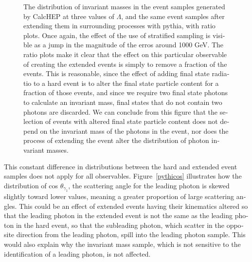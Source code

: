 \begin{english}
\begin{figure}[hbt]
\centering
\begin{minipage}[b]{.69\textwidth}\hspace{-1.5em}\makebox[0pt][l]{
\noindent\begin{infilsf}
\tiny

\end{infilsf}}
\end{minipage}\hfill
\caption{The distribution of invariant masses in the event samples generated by CalcHEP at three values of $\Lambda$, and the same event samples after extending them in surrounding processes with pythia, with ratio plots. Once again, the effect of the use of stratified sampling is visible as a jump in the magnitude of the erros around 1000 GeV. The ratio plots make it clear that the effect on this particular observable of creating the extended events is simply to remove a fraction of the events. This is reasonable, since the effect of adding final state radiatio to a hard event is to alter the final state particle content for a fraction of those events, and since we require two final state photons to calculate an invariant mass, final states that do not contain two photons are discarded. We can conclude from this figure that the selection of events with altered final state particle content does not depend on the invariant mass of the photons in the event, nor does the process of extending the event alter the distribution of photon invariant masses.
\label{pythify}}
\end{figure}

This constant difference in distributions between the hard and extended event samples does not apply for all observables. Figure~\ref{pythicos} illustrates how the distribution of cos $\theta_{\gamma_1}$, the scattering angle for the leading photon is skewed slightly toward lower values, meaning a greater proportion of large scattering angles. This could be an effect of extended events having their kinematics altered so that the leading photon in the extended event is not the same as the leading photon in the hard event, so that the subleading photon, which scatter in the opposite direction from the leading photon, spill into the leading photon sample. This would also explain why the invariant mass sample, which is not sensitive to the identification of a leading photon, is not affected.


\end{english}
